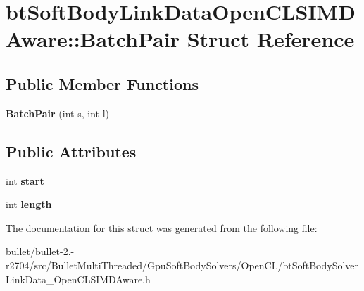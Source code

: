 \hypertarget{structbt_soft_body_link_data_open_c_l_s_i_m_d_aware_1_1_batch_pair}{\section{bt\+Soft\+Body\+Link\+Data\+Open\+C\+L\+S\+I\+M\+D\+Aware\+:\+:Batch\+Pair Struct Reference}
\label{structbt_soft_body_link_data_open_c_l_s_i_m_d_aware_1_1_batch_pair}
}
\subsection*{Public Member Functions}
\begin{DoxyCompactItemize}
\item 
\hypertarget{structbt_soft_body_link_data_open_c_l_s_i_m_d_aware_1_1_batch_pair_ac91d85b4108a08b2060ccb1e97d12189}{{\bfseries Batch\+Pair} (int s, int l)}\label{structbt_soft_body_link_data_open_c_l_s_i_m_d_aware_1_1_batch_pair_ac91d85b4108a08b2060ccb1e97d12189}

\end{DoxyCompactItemize}
\subsection*{Public Attributes}
\begin{DoxyCompactItemize}
\item 
\hypertarget{structbt_soft_body_link_data_open_c_l_s_i_m_d_aware_1_1_batch_pair_a5a369244eafcaf7865f38b209062d8a2}{int {\bfseries start}}\label{structbt_soft_body_link_data_open_c_l_s_i_m_d_aware_1_1_batch_pair_a5a369244eafcaf7865f38b209062d8a2}

\item 
\hypertarget{structbt_soft_body_link_data_open_c_l_s_i_m_d_aware_1_1_batch_pair_a0a5ccf104b720f5f8537d7a6c819fd7f}{int {\bfseries length}}\label{structbt_soft_body_link_data_open_c_l_s_i_m_d_aware_1_1_batch_pair_a0a5ccf104b720f5f8537d7a6c819fd7f}

\end{DoxyCompactItemize}


The documentation for this struct was generated from the following file\+:\begin{DoxyCompactItemize}
\item 
bullet/bullet-\/2.-\/r2704/src/\+Bullet\+Multi\+Threaded/\+Gpu\+Soft\+Body\+Solvers/\+Open\+C\+L/bt\+Soft\+Body\+Solver\+Link\+Data\+\_\+\+Open\+C\+L\+S\+I\+M\+D\+Aware.\+h\end{DoxyCompactItemize}
